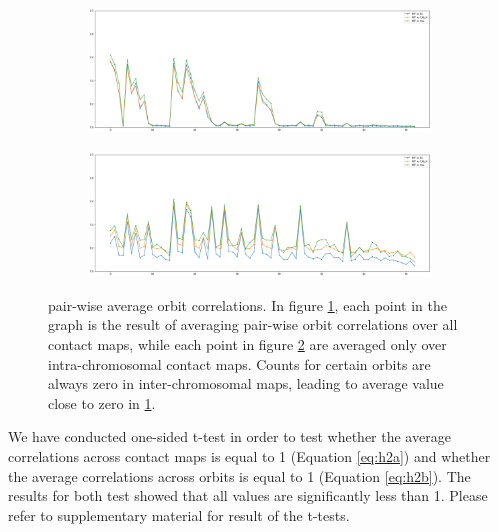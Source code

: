 \documentclass[a4,center,fleqn]{NAR}
\begin{document}
\begin{figure}[t]
    \centering
    \begin{subfigure}[b]{\textwidth}
        \includegraphics[width=\textwidth, height=.2\paperheight]{figures/orbits_correlations_all.png}
        \caption{}
        \label{fig:orbits_correlations_all}
    \end{subfigure}
    \begin{subfigure}[b]{\textwidth}
        \includegraphics[width=\textwidth, height=.2\paperheight]{figures/orbits_correlations_intra.png}
        \caption{}
        \label{fig:orbits_correlations_intra}
    \end{subfigure}
    \caption{pair-wise average orbit correlations.
             In figure \ref{fig:orbits_correlations_all}, each point
             in the graph is the result of averaging pair-wise
             orbit correlations over all contact maps, while
             each point in figure \ref{fig:orbits_correlations_intra}
             are averaged only over intra-chromosomal contact maps.
             Counts for certain orbits are always zero in inter-chromosomal
             maps, leading to average value close to zero in 
             \ref{fig:orbits_correlations_all}.
             }
    \label{fig:orbits_correlations}
\end{figure}
We have conducted one-sided
t-test in order to test whether the average correlations across
contact maps is equal to 1 (Equation \ref{eq:h2a}) and whether the average 
correlations across orbits is equal to 1 (Equation \ref{eq:h2b}). The results
for both test showed that all values are significantly less than 1.
Please refer to supplementary material for result of the t-tests.
\end{document}
